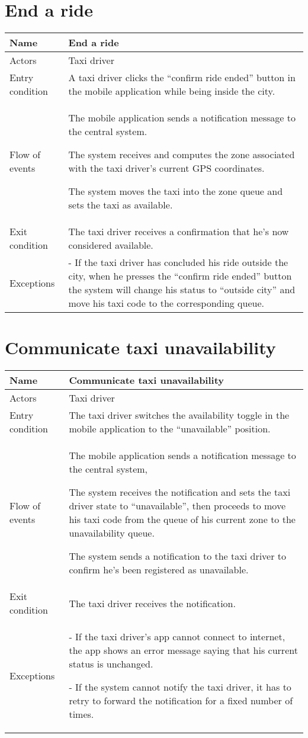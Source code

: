 \section{End a ride}
\begin{center}
\begin{longtable}{|l| p{9cm}|}
\hline
Name &
End a ride \\
\hline
Actors &
Taxi driver \\
\hline
Entry condition & 
A taxi driver clicks the “confirm ride ended” button in the mobile application while being inside the city. \\
\hline
Flow of events & 
The mobile application sends a notification message to the central system.

The system receives and computes the zone associated with the taxi driver's current GPS coordinates.

The system moves the taxi into the zone queue and sets the taxi as available. \\
\hline
Exit condition &
The taxi driver receives a confirmation that he's now considered available. \\
\hline
Exceptions &
- If the taxi driver has concluded his ride outside the city, when he presses the “confirm ride ended” button the system will change his status to “outside city” and move his taxi code to the corresponding queue.\\
\hline
\end{longtable}
\end{center}


\section{Communicate taxi unavailability}
\begin{center}
\begin{longtable}{|l| p{9cm}|}
\hline
Name &
Communicate taxi unavailability \\
\hline
Actors &
Taxi driver \\
\hline
Entry condition & 
The taxi driver switches the availability toggle in the mobile application to the “unavailable” position. \\
\hline
Flow of events & 
The mobile application sends a notification message to the central system, 

The system receives the notification and sets the taxi driver state to “unavailable”, then proceeds to move his taxi code from the queue of his current zone to the unavailability queue.

The system sends a notification to the taxi driver to confirm he's been registered as unavailable. \\
\hline
Exit condition &
The taxi driver receives the notification. \\
\hline
Exceptions &
- If the taxi driver's app cannot connect to internet, the app shows an error message saying that his current status is unchanged.

- If the system cannot notify the taxi driver, it has to retry to forward the notification for a fixed number of times. \\
\hline
\end{longtable}
\end{center}


